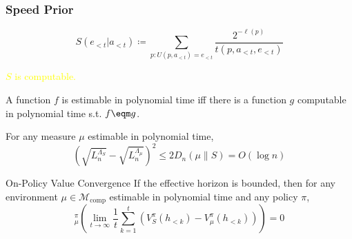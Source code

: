 \documentclass[UTF8,11pt,colorlinks,compress,openany]{beamer}%
\begin{document}
\begin{frame}\frametitle{Speed Prior}\vspace{-2ex}
\setlength\abovedisplayskip{0pt}
\setlength\belowdisplayskip{0pt}
	\[S(e_{<t}|a_{<t})\coloneqq \sum\limits_{p:U(p,a_{<t})=e_{<t}}\frac{2^{-\ell(p)}}{t(p,a_{<t},e_{<t})}\]
	\begin{center}
		\textcolor{yellow}{$S$ is computable.}
	\end{center}
	A function $f$ is estimable in polynomial time iff there is a function $g$ computable in polynomial time s.t. $f\eqm g$.
	\begin{block}{}
		For any measure $\mu$ estimable in polynomial time,
		\[
		\left(\sqrt{L_n^{\Lambda_S}}-\sqrt{L_n^{\Lambda_\mu}}\right)^2\leq 2D_n(\mu\|S)=O\left(\log n\right)
		\]\vspace{-1ex}
	\end{block}
	\begin{block}{On-Policy Value Convergence}
		If the effective horizon is bounded, then for any environment $\mu\in\mathcal{M}_{\mathrm{comp}}$ estimable in polynomial time and any policy $\pi$,
		\[{}_\mu^\pi\left(\lim\limits_{t\to\infty}\frac{1}{t}\sum\limits_{k=1}^t\left(V_S^\pi(h_{<k})-V_\mu^\pi(h_{<k})\right)\right)=0\]\vspace{-1ex}
	\end{block}
\end{frame}
\end{document}
